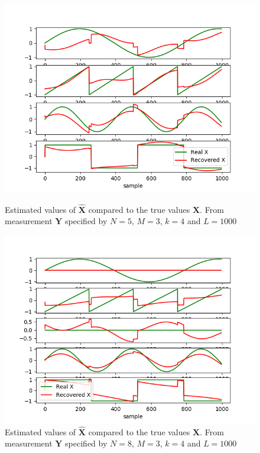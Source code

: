 \begin{figure}[H]
    \begin{minipage}[t]{.45\textwidth}
    	\centering
		\includegraphics[scale=0.5]{figures/ch_6/M-SBL_simple1.png}
		\caption{Estimated values of $\hat{\textbf{X}}$ compared to the true 					values $\textbf{X}$. From measurement $\textbf{Y}$ specified by $N=5$, $M = 3$, $k=4$ and $L=1000$}
		\label{fig:M-SBL_simple1}
    \end{minipage} 
    \hfill
    \begin{minipage}[t]{.45\textwidth}
        \centering
		\includegraphics[scale=0.5]{figures/ch_6/M-SBL_simple2.png}
		\caption{Estimated values of $\hat{\textbf{X}}$ compared to the true 				values $\textbf{X}$. From measurement $\textbf{Y}$ specified by $N=8$, $M = 3$, $k=4$ and $L=1000$ }
		\label{fig:M-SBL_simple2}
    \end{minipage}
\end{figure}
